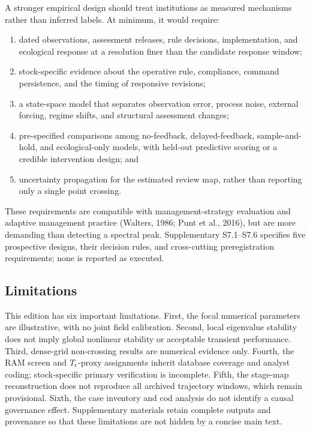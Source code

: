 A stronger empirical design should treat institutions as measured mechanisms rather than inferred labels. At minimum, it would require:
\begin{enumerate}
\item dated observations, assessment releases, rule decisions, implementation, and ecological response at a resolution finer than the candidate response window;
\item stock-specific evidence about the operative rule, compliance, command persistence, and the timing of responsive revisions;
\item a state-space model that separates observation error, process noise, external forcing, regime shifts, and structural assessment changes;
\item pre-specified comparisons among no-feedback, delayed-feedback, sample-and-hold, and ecological-only models, with held-out predictive scoring or a credible intervention design; and
\item uncertainty propagation for the estimated review map, rather than reporting only a single point crossing.
\end{enumerate}
These requirements are compatible with management-strategy evaluation and adaptive management practice (Walters, 1986; Punt et al., 2016), but are more demanding than detecting a spectral peak. Supplementary S7.1--S7.6 specifies five prospective designs, their decision rules, and cross-cutting preregistration requirements; none is reported as executed.

\subsection{Limitations}

This edition has six important limitations. First, the focal numerical parameters are illustrative, with no joint field calibration. Second, local eigenvalue stability does not imply global nonlinear stability or acceptable transient performance. Third, dense-grid non-crossing results are numerical evidence only. Fourth, the RAM screen and \(T_{\mathrm r}\)-proxy assignments inherit database coverage and analyst coding; stock-specific primary verification is incomplete. Fifth, the stage-map reconstruction does not reproduce all archived trajectory windows, which remain provisional. Sixth, the case inventory and cod analysis do not identify a causal governance effect. Supplementary materials retain complete outputs and provenance so that these limitations are not hidden by a concise main text.

